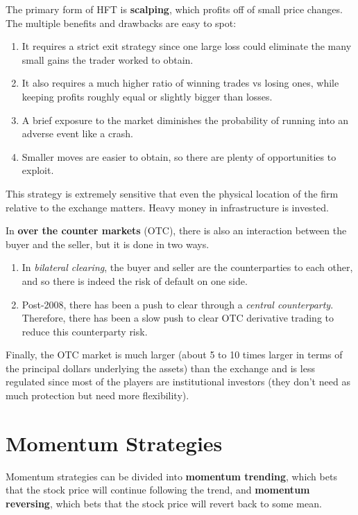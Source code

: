 \documentclass{article}
\begin{document}
      The primary form of HFT is \textbf{scalping}, which profits off of small price changes. The multiple benefits and drawbacks are easy to spot: 
      \begin{enumerate}
          \item It requires a strict exit strategy since one large loss could eliminate the many small gains the trader worked to obtain. 
          \item It also requires a much higher ratio of winning trades vs losing ones, while keeping profits roughly equal or slightly bigger than losses. 
          \item A brief exposure to the market diminishes the probability of running into an adverse event like a crash. 
          \item Smaller moves are easier to obtain, so there are plenty of opportunities to exploit. 
      \end{enumerate}
      This strategy is extremely sensitive that even the physical location of the firm relative to the exchange matters. Heavy money in infrastructure is invested. 


    \begin{definition}
      In \textbf{over the counter markets} (OTC), there is also an interaction between the buyer and the seller, but it is done in two ways. 
      \begin{enumerate}
        \item In \textit{bilateral clearing}, the buyer and seller are the counterparties to each other, and so there is indeed the risk of default on one side. 
        \item Post-2008, there has been a push to clear through a \textit{central counterparty}. Therefore, there has been a slow push to clear OTC derivative trading to reduce this counterparty risk. 
      \end{enumerate}
      Finally, the OTC market is much larger (about 5 to 10 times larger in terms of the principal dollars underlying the assets) than the exchange and is less regulated since most of the players are institutional investors (they don't need as much protection but need more flexibility).  
    \end{definition}

\section{Momentum Strategies}

  Momentum strategies can be divided into \textbf{momentum trending}, which bets that the stock price will continue following the trend, and \textbf{momentum reversing}, which bets that the stock price will revert back to some mean. 
\end{document}
